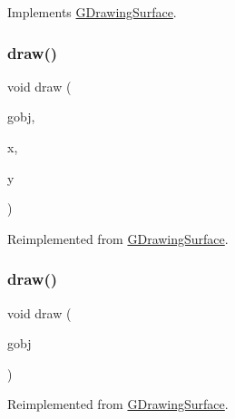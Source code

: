 Implements \mbox{\hyperlink{classGDrawingSurface_ae65b7cc9bdfbc1bd01bec80ba83aab47}{G\+Drawing\+Surface}}.

\mbox{\label{classGForwardDrawingSurface_aa3894eb70ef929191bea127a39d1f9f6}} 
\subsubsection{\texorpdfstring{draw()}{draw()}\hspace{0.1cm}{\footnotesize\ttfamily [2/5]}}
{\footnotesize\ttfamily void draw (\begin{DoxyParamCaption}\item[{\mbox{\hyperlink{classGObject}{G\+Object}} $\ast$}]{gobj,  }\item[{double}]{x,  }\item[{double}]{y }\end{DoxyParamCaption})\hspace{0.3cm}{\ttfamily [virtual]}}



Reimplemented from \mbox{\hyperlink{classGDrawingSurface_acc3825d7a24815d1e2f78e7c3ffea6cc}{G\+Drawing\+Surface}}.

\mbox{\label{classGForwardDrawingSurface_a6dcc6b7c3c5266f9634c61e01e097f2a}} 
\subsubsection{\texorpdfstring{draw()}{draw()}\hspace{0.1cm}{\footnotesize\ttfamily [3/5]}}
{\footnotesize\ttfamily void draw (\begin{DoxyParamCaption}\item[{\mbox{\hyperlink{classGObject}{G\+Object}} \&}]{gobj }\end{DoxyParamCaption})\hspace{0.3cm}{\ttfamily [virtual]}}



Reimplemented from \mbox{\hyperlink{classGDrawingSurface_a022a8d51c7fabcd79a0c809233e93453}{G\+Drawing\+Surface}}.

